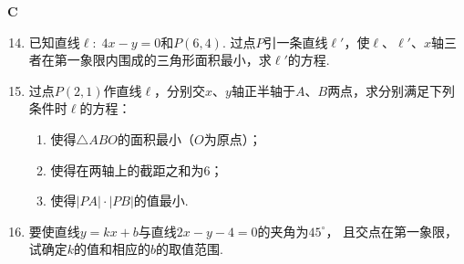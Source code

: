 \begin{center}
    \bfseries C
\end{center}

\begin{enumerate}\setcounter{enumi}{13}
 \item 已知直线$\ell:\; 4x-y=0$和$P(6,4)$. 过点$P$引一条直线$\ell'$，使$\ell$、$\ell'$、$x$轴三者在第一象限内围成的三角形面积最小，求$\ell'$的方程.

 \item 过点$P(2,1)$作直线$\ell$，分别交$x$、$y$轴正半轴于$A$、$B$两点，求分别满足下列条件时$\ell$的方程：
 \begin{enumerate}[(1)]
 \item 使得$\triangle ABO$的面积最小（$O$为原点）；
 \item 使得在两轴上的截距之和为6；
 \item 使得$|PA|\cdot |PB|$的值最小.
 \end{enumerate}

 \item 要使直线$y=kx+b$与直线$2x-y-4=0$的夹角为$45^{\circ}$，
 且交点在第一象限，试确定$k$的值和相应的$b$的取值范围.
\end{enumerate}